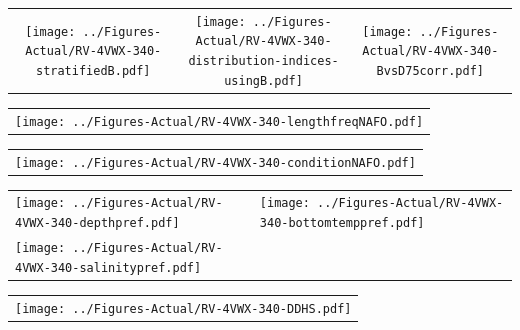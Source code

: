 \documentclass[12pt]{article}\usepackage[]{graphicx}\usepackage[]{color}
\begin{document}
\vspace{1cm}
\begin{minipage}{1.0\textwidth}
 \begin{tabular}{ccc}
\texttt{[image: ../Figures-Actual/RV-4VWX-340-stratifiedB.pdf]} & 
\texttt{[image: ../Figures-Actual/RV-4VWX-340-distribution-indices-usingB.pdf]} & 
\texttt{[image: ../Figures-Actual/RV-4VWX-340-BvsD75corr.pdf]} \\ 
\end{tabular} 
\end{minipage}
\clearpage
\begin{minipage}{1.0\textwidth}
 \begin{tabular}{c}
\texttt{[image: ../Figures-Actual/RV-4VWX-340-lengthfreqNAFO.pdf]} \\ 
\end{tabular} 
\end{minipage}
\newline

\vspace{1cm}
\begin{minipage}{1.0\textwidth}
 \begin{tabular}{c}
\texttt{[image: ../Figures-Actual/RV-4VWX-340-conditionNAFO.pdf]} \\ 
\end{tabular} 
\end{minipage}
\clearpage
\begin{minipage}{1.0\textwidth}
 \begin{tabular}[t]{m{3in}m{3in}}
\texttt{[image: ../Figures-Actual/RV-4VWX-340-depthpref.pdf]} & 
\texttt{[image: ../Figures-Actual/RV-4VWX-340-bottomtemppref.pdf]} \\ 
\texttt{[image: ../Figures-Actual/RV-4VWX-340-salinitypref.pdf]} & 
 \\ 
\end{tabular} 
\end{minipage}
\newline

\vspace{1cm}
\begin{minipage}{1.0\textwidth}
 \begin{tabular}{c}
\texttt{[image: ../Figures-Actual/RV-4VWX-340-DDHS.pdf]} \\ 
\end{tabular} 
\end{minipage}
\clearpage
\end{document}
